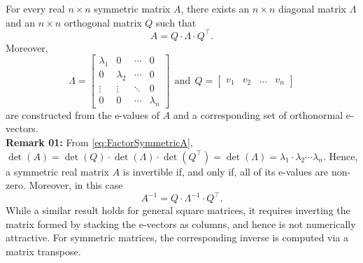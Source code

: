 \begin{tcolorbox}[sharp corners, colback=green!30, colframe=green!80!blue, title=\textbf{\large Factoring a Symmetric Matrix}]

For every real $n \times n$ symmetric matrix $A$, there exists an $n \times n $ diagonal matrix $\Lambda$ and an $n \times n $ orthogonal matrix $Q$ such that
\begin{equation}
    \label{eq:FactorSymmetricA}
    A = Q \cdot \Lambda \cdot Q^\top.
\end{equation}
Moreover, 
$$\Lambda=\left[\begin{array}{cccc}
    \lambda_1 & 0  & \cdots & 0\\
    0 & \lambda_2 &  \cdots & 0 \\
    \vdots & \vdots & \ddots & 0\\
    0 &  0 & \cdots  & \lambda_n
    \end{array}\right] ~~\text{and}~~Q = \left[\begin{array}{ccccc}
  v_1 & v_2  & \ldots & v_n
    \end{array}\right]$$
are constructed from the e-values of $A$ and a corresponding set of orthonormal e-vectors.\\


\textbf{Remark 01:} From \eqref{eq:FactorSymmetricA}, $\det(A) = \det(Q) \cdot \det(\Lambda) \cdot \det(Q^\top) = \det(\Lambda) = \lambda_1 \cdot \lambda_2 \cdots \lambda_n$. Hence, a symmetric real matrix $A$ is invertible if, and only if, all of its e-values are non-zero. Moreover, in this case
$$A^{-1}=Q \cdot \Lambda^{-1} \cdot Q^\top. $$
While a similar result holds for general square matrices, it requires inverting the matrix formed by stacking the e-vectors as columns, and hence is not numerically attractive. For symmetric matrices, the corresponding inverse is computed via a matrix transpose.\\



\end{tcolorbox}
